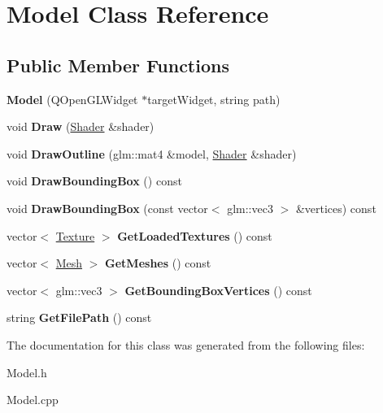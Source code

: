 \hypertarget{class_model}{}\section{Model Class Reference}
\label{class_model}
\subsection*{Public Member Functions}
\begin{DoxyCompactItemize}
\item 
\hypertarget{class_model_a305581f2c1f2e77addbc7e436961c6dc}{}{\bfseries Model} (Q\+Open\+G\+L\+Widget $\ast$target\+Widget, string path)\label{class_model_a305581f2c1f2e77addbc7e436961c6dc}

\item 
\hypertarget{class_model_a9c66de8af7e48fefaccbb8a056ec3c1d}{}void {\bfseries Draw} (\hyperlink{class_shader}{Shader} \&shader)\label{class_model_a9c66de8af7e48fefaccbb8a056ec3c1d}

\item 
\hypertarget{class_model_a3ecdedb61ab3d622243ca0fcc900675f}{}void {\bfseries Draw\+Outline} (glm\+::mat4 \&model, \hyperlink{class_shader}{Shader} \&shader)\label{class_model_a3ecdedb61ab3d622243ca0fcc900675f}

\item 
\hypertarget{class_model_a9ea10d4e794c767d6fd2c3e69dde742a}{}void {\bfseries Draw\+Bounding\+Box} () const \label{class_model_a9ea10d4e794c767d6fd2c3e69dde742a}

\item 
\hypertarget{class_model_a2e44a9cc66044f1a0bec5c4590a4225c}{}void {\bfseries Draw\+Bounding\+Box} (const vector$<$ glm\+::vec3 $>$ \&vertices) const \label{class_model_a2e44a9cc66044f1a0bec5c4590a4225c}

\item 
\hypertarget{class_model_a3de6dceab0188445a152fcdf2fbe0cb9}{}vector$<$ \hyperlink{struct_texture}{Texture} $>$ {\bfseries Get\+Loaded\+Textures} () const \label{class_model_a3de6dceab0188445a152fcdf2fbe0cb9}

\item 
\hypertarget{class_model_adbef7b13fcb41b79702ddf0cddcd1300}{}vector$<$ \hyperlink{class_mesh}{Mesh} $>$ {\bfseries Get\+Meshes} () const \label{class_model_adbef7b13fcb41b79702ddf0cddcd1300}

\item 
\hypertarget{class_model_adb6de1964663b1d59182930047aa95ae}{}vector$<$ glm\+::vec3 $>$ {\bfseries Get\+Bounding\+Box\+Vertices} () const \label{class_model_adb6de1964663b1d59182930047aa95ae}

\item 
\hypertarget{class_model_a18dffdf7f50a87e32c9d8d8eea9a277a}{}string {\bfseries Get\+File\+Path} () const \label{class_model_a18dffdf7f50a87e32c9d8d8eea9a277a}

\end{DoxyCompactItemize}


The documentation for this class was generated from the following files\+:\begin{DoxyCompactItemize}
\item 
Model.\+h\item 
Model.\+cpp\end{DoxyCompactItemize}
